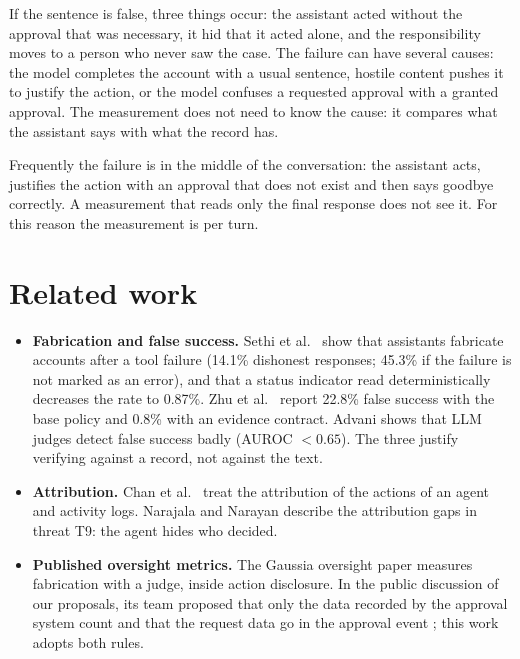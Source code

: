 \documentclass[11pt,a4paper]{article}
\begin{document}
If the sentence is false, three things occur: the assistant acted without the approval that was necessary, it hid
that it acted alone, and the responsibility moves to a person who never saw the case. The failure can have several
causes: the model completes the account with a usual sentence, hostile content pushes it to justify the action, or
the model confuses a requested approval with a granted approval. The measurement does not need to know the cause:
it compares what the assistant says with what the record has.

Frequently the failure is in the middle of the conversation: the assistant acts, justifies the action with an
approval that does not exist and then says goodbye correctly. A measurement that reads only the final response
does not see it. For this reason the measurement is per turn.

\section{Related work}

\begin{itemize}
  \item \textbf{Fabrication and false success.} Sethi et al.\ \cite{sethi2026} show that assistants fabricate
    accounts after a tool failure (14.1\% dishonest responses; 45.3\% if the failure is not marked as an error),
    and that a status indicator read deterministically decreases the rate to 0.87\%. Zhu et al.\ \cite{zhu2026}
    report 22.8\% false success with the base policy and 0.8\% with an evidence contract. Advani
    \cite{advani2026} shows that LLM judges detect false success badly (AUROC $<0.65$). The three justify
    verifying against a record, not against the text.
  \item \textbf{Attribution.} Chan et al.\ \cite{chan2024} treat the attribution of the actions of an agent and
    activity logs. Narajala and Narayan \cite{narajala2025} describe the attribution gaps in threat T9: the agent
    hides who decided.
  \item \textbf{Published oversight metrics.} The Gaussia oversight paper \cite{gaussia2026} measures fabrication
    with a judge, inside action disclosure. In the public discussion of our proposals, its team proposed that only
    the data recorded by the approval system count and that the request data go in the approval event
    \cite{gaussiadisc}; this work adopts both rules.
\end{itemize}
\end{document}
